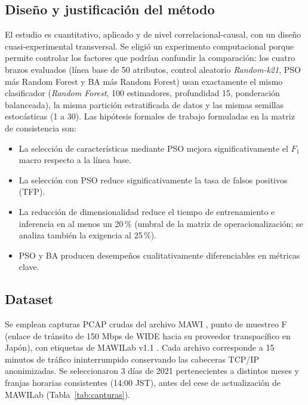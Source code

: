 \documentclass[11pt,a4paper]{article}
\begin{document}
\subsection{Diseño y justificación del método}
El estudio es cuantitativo, aplicado y de nivel correlacional-causal, con un diseño cuasi-experimental transversal. Se eligió un experimento computacional porque permite controlar los factores que podrían confundir la comparación: los cuatro brazos evaluados (línea base de 50 atributos, control aleatorio \emph{Random-k21}, PSO más Random Forest y BA más Random Forest) usan exactamente el mismo clasificador (\emph{Random Forest}, 100 estimadores, profundidad 15, ponderación balanceada), la misma partición estratificada de datos y las mismas semillas estocásticas (1 a 30). Las hipótesis formales de trabajo formuladas en la matriz de consistencia son:
\begin{itemize}[leftmargin=1.5em,itemsep=1pt]
  \item[\textbf{H1:}] La selección de características mediante PSO mejora significativamente el $F_1$ macro respecto a la línea base.
  \item[\textbf{H2:}] La selección con PSO reduce significativamente la tasa de falsos positivos (TFP).
  \item[\textbf{H3:}] La reducción de dimensionalidad reduce el tiempo de entrenamiento e inferencia en al menos un 20\,\% (umbral de la matriz de operacionalización; se analiza también la exigencia al 25\,\%).
  \item[\textbf{H4:}] PSO y BA producen desempeños cualitativamente diferenciables en métricas clave.
\end{itemize}

\subsection{Dataset}
Se emplean capturas PCAP crudas del archivo MAWI \parencite{mawiarchive}, punto de muestreo F (enlace de tránsito de 150 Mbps de WIDE hacia su proveedor transpacífico en Japón), con etiquetas de MAWILab v1.1 \parencite{fontugne2010}. Cada archivo corresponde a 15 minutos de tráfico ininterrumpido conservando las cabeceras TCP/IP anonimizadas. Se seleccionaron 3 días de 2021 pertenecientes a distintos meses y franjas horarias consistentes (14:00 JST), antes del cese de actualización de MAWILab (Tabla~\ref{tab:capturas}).
\end{document}
